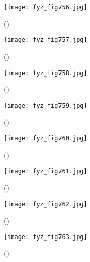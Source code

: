 {    \begin{figure}[ht!] %
      \centering
      \texttt{[image: fyz\_fig756.jpg]}
      \caption{
               (\cite[s.~707]{Feynman02})}
      \label{fyz_fig756}
    \end{figure}

    \begin{figure}[ht!] %
      \centering
      \texttt{[image: fyz\_fig757.jpg]}
      \caption{
               (\cite[s.~707]{Feynman02})}
      \label{fyz_fig757}
    \end{figure}

    \begin{figure}[ht!] %
      \centering
      \texttt{[image: fyz\_fig758.jpg]}
      \caption{
               (\cite[s.~707]{Feynman02})}
      \label{fyz_fig758}
    \end{figure}

    \begin{figure}[ht!] %
      \centering
      \texttt{[image: fyz\_fig759.jpg]}
      \caption{
               (\cite[s.~707]{Feynman02})}
      \label{fyz_fig759}
    \end{figure}
    
    \begin{figure}[ht!] %
      \centering
      \texttt{[image: fyz\_fig760.jpg]}
      \caption{
               (\cite[s.~707]{Feynman02})}
      \label{fyz_fig760}
    \end{figure}

    \begin{figure}[ht!] %
      \centering
      \texttt{[image: fyz\_fig761.jpg]}
      \caption{
               (\cite[s.~707]{Feynman02})}
      \label{fyz_fig761}
    \end{figure}

    \begin{figure}[ht!] %
      \centering
      \texttt{[image: fyz\_fig762.jpg]}
      \caption{
               (\cite[s.~707]{Feynman02})}
      \label{fyz_fig762}
    \end{figure}

    \begin{figure}[ht!] %
      \centering
      \texttt{[image: fyz\_fig763.jpg]}
      \caption{
               (\cite[s.~707]{Feynman02})}
      \label{fyz_fig763}
    \end{figure}

}
